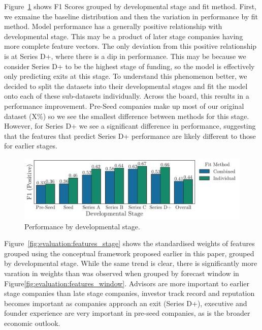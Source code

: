 ﻿\documentclass[../thesis/thesis.tex]{subfiles}
\begin{document}
Figure~\ref{fig:evaluation:performance_stage} shows F1 Scores grouped by developmental stage and fit method. First, we exmaine the baseline distribution and then the variation in performance by fit method. Model performance has a generally positive relationship with developmental stage. This may be a product of later stage companies having more complete feature vectors. The only deviation from this positive relationship is at Series D+, where there is a dip in performance. This may be because we consider Series D+ to be the highest stage of funding, so the model is effectively only predicting exits at this stage. To understand this phenomenon better, we decided to split the datasets into their developmental stages and fit the model onto each of these sub-datasets individually. Across the board, this results in a performance improvement. Pre-Seed companies make up most of our original dataset (X\%) so we see the smallest difference between methods for this stage. However, for Series D+ we see a significant difference in performance, suggesting that the features that predict Series D+ performance are likely different to those for earlier stages. 

\begin{figure}[!htb]
    \centering
    \includegraphics[width=\textwidth]{../figures/evaluation/performance_stage}
    \caption[Performance by developmental stage]{Performance by developmental stage.}
    \label{fig:evaluation:performance_stage}
\end{figure}

Figure~\ref{fig:evaluation:features_stage} shows the standardised weights of features grouped using the conceptual framework proposed earlier in this paper, grouped by developmental stage. While the same trend is clear, there is significantly more varation in weights than was observed when grouped by forecast window in Figure\ref{fig:evaluation:features_window}. Advisors are more important to earlier stage companies than late stage companies, investor track record and reputation becomes important as companies approach an exit (Series D+), executive and founder experience are very important in pre-seed companies, as is the broader economic outlook.
\end{document}
